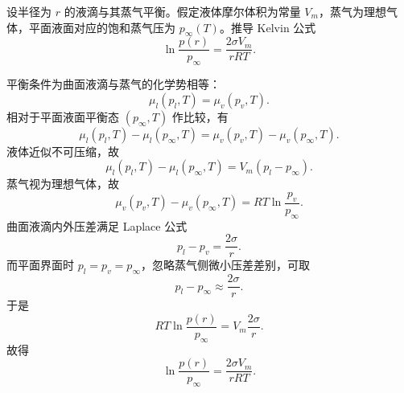 \begin{question}
设半径为 $r$ 的液滴与其蒸气平衡。假定液体摩尔体积为常量 $V_m$，蒸气为理想气体，平面液面对应的饱和蒸气压为 $p_\infty(T)$。推导 Kelvin 公式
\[
\ln\frac{p(r)}{p_\infty}=\frac{2\sigma V_m}{rRT}.
\]
\begin{solution}

平衡条件为曲面液滴与蒸气的化学势相等：
\[
\mu_l(p_l,T)=\mu_v(p_v,T).
\]
相对于平面液面平衡态 $(p_\infty,T)$ 作比较，有
\[
\mu_l(p_l,T)-\mu_l(p_\infty,T)=\mu_v(p_v,T)-\mu_v(p_\infty,T).
\]
液体近似不可压缩，故
\[
\mu_l(p_l,T)-\mu_l(p_\infty,T)=V_m(p_l-p_\infty).
\]
蒸气视为理想气体，故
\[
\mu_v(p_v,T)-\mu_v(p_\infty,T)=RT\ln\frac{p_v}{p_\infty}.
\]
曲面液滴内外压差满足 Laplace 公式
\[
p_l-p_v=\frac{2\sigma}{r}.
\]
而平面界面时 $p_l=p_v=p_\infty$，忽略蒸气侧微小压差差别，可取
\[
p_l-p_\infty\approx \frac{2\sigma}{r}.
\]
于是
\[
RT\ln\frac{p(r)}{p_\infty}=V_m\frac{2\sigma}{r}.
\]
故得
\[
\ln\frac{p(r)}{p_\infty}=\frac{2\sigma V_m}{rRT}.
\]
\end{solution}
\end{question}


